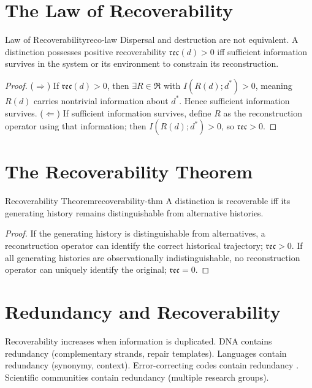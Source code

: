 \documentclass[12pt,twoside,openright]{book}
\newcommand{\reco}{\mathfrak{rec}}
\begin{document}
\section{The Law of Recoverability}
\label{sec:ch5-law}

\begin{theorem}{Law of Recoverability}{reco-law}
  Dispersal and destruction are not equivalent. A
  distinction possesses positive recoverability
  $\reco(d) > 0$ iff sufficient information survives
  in the system or its environment to constrain its
  reconstruction.
\end{theorem}

\begin{proof}
  ($\Rightarrow$) If $\reco(d) > 0$, then
  $\exists R \in \mathfrak{R}$ with $I(R(d); d^*) > 0$,
  meaning $R(d)$ carries nontrivial information about
  $d^*$. Hence sufficient information survives.
  ($\Leftarrow$) If sufficient information survives,
  define $R$ as the reconstruction operator using that
  information; then $I(R(d); d^*) > 0$, so $\reco > 0$.
\end{proof}

\section{The Recoverability Theorem}
\label{sec:ch5-recov}

\begin{theorem}{Recoverability Theorem}{recoverability-thm}
  A distinction is recoverable iff its generating history
  remains distinguishable from alternative histories.
\end{theorem}

\begin{proof}
  If the generating history is distinguishable from
  alternatives, a reconstruction operator can identify
  the correct historical trajectory; $\reco > 0$.
  If all generating histories are observationally
  indistinguishable, no reconstruction operator can
  uniquely identify the original; $\reco = 0$.
\end{proof}

\section{Redundancy and Recoverability}
\label{sec:ch5-redundancy}

Recoverability increases when information is duplicated.
DNA contains redundancy (complementary strands, repair
templates). Languages contain redundancy (synonymy,
context). Error-correcting codes contain redundancy
\parencite{mackay2003}. Scientific communities contain
redundancy (multiple research groups).
\end{document}
